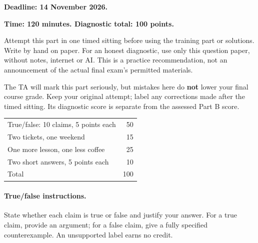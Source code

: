 \textbf{Deadline: 14 November 2026.}

\textbf{Time: 120 minutes. Diagnostic total: 100 points.}

Attempt this part in one timed sitting before using the training part or solutions. Write by hand on paper. For an honest diagnostic, use only this question paper, without notes, internet or AI. This is a practice recommendation, not an announcement of the actual final exam's permitted materials.

The TA will mark this part seriously, but mistakes here do \textbf{not} lower your final course grade. Keep your original attempt; label any corrections made after the timed sitting. Its diagnostic score is separate from the assessed Part B score.

\begin{center}\begin{tabular}{lr}
True/false: 10 claims, 5 points each & 50\\
Two tickets, one weekend & 15\\
One more lesson, one less coffee & 25\\
Two short answers, 5 points each & 10\\\hline
Total & 100
\end{tabular}\end{center}
\paragraph{True/false instructions.} State whether each claim is true or false and justify your answer. For a true claim, provide an argument; for a false claim, give a fully specified counterexample. An unsupported label earns no credit.
